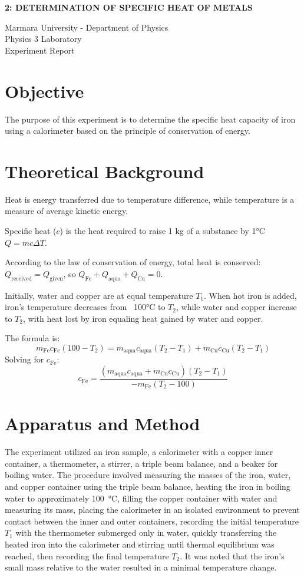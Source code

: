 \documentclass[12pt, a4paper]{article}
\begin{document}
\begin{center}
	\Large \textbf{2: DETERMINATION OF SPECIFIC HEAT OF METALS}
	\vspace{0.5cm}
	
	\normalsize Marmara University - Department of Physics \\
	Physics 3 Laboratory \\
	Experiment Report
	\vspace{0.5cm}
\end{center}

\section{Objective}
The purpose of this experiment is to determine the specific heat capacity of iron using a calorimeter based on the principle of conservation of energy.

\section{Theoretical Background}
Heat is energy transferred due to temperature difference, while temperature is a measure of average kinetic energy.

Specific heat ($c$) is the heat required to raise 1 kg of a substance by 1°C $Q = m c \Delta T$.

According to the law of conservation of energy, total heat is conserved: $Q_{\text{received}} = Q_{\text{given}}$, so $Q_{\text{Fe}} + Q_{\text{aqua}} + Q_{\text{Cu}} = 0$.

Initially, water and copper are at equal temperature $T_1$. When hot iron is added, iron's temperature decreases from ~100°C to $T_2$, while water and copper increase to $T_2$, with heat lost by iron equaling heat gained by water and copper.

The formula is:
\[
m_{\text{Fe}} c_{\text{Fe}} (100 - T_2) = m_{\text{aqua}} c_{\text{aqua}} (T_2 - T_1) + m_{\text{Cu}} c_{\text{Cu}} (T_2 - T_1)
\]
Solving for $c_{\text{Fe}}$:
\[
c_{\text{Fe}} = \frac{(m_{\text{aqua}} c_{\text{aqua}} + m_{\text{Cu}} c_{\text{Cu}}) (T_2 - T_1)}{-m_{\text{Fe}} (T_2 - 100)}
\]

\section{Apparatus and Method}
The experiment utilized an iron sample, a calorimeter with a copper inner container, a thermometer, a stirrer, a triple beam balance, and a beaker for boiling water. The procedure involved measuring the masses of the iron, water, and copper container using the triple beam balance, heating the iron in boiling water to approximately \SI{100}{\celsius}, filling the copper container with water and measuring its mass, placing the calorimeter in an isolated environment to prevent contact between the inner and outer containers, recording the initial temperature $T_1$ with the thermometer submerged only in water, quickly transferring the heated iron into the calorimeter and stirring until thermal equilibrium was reached, then recording the final temperature $T_2$. It was noted that the iron's small mass relative to the water resulted in a minimal temperature change.
\end{document}
